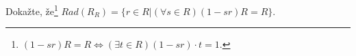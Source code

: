 \documentclass[12pt]{article}					%
\begin{document}

\begin{priklad}
	Dokažte, že\footnote{$(1 - sr) R = R \Leftrightarrow (\exists t \in R) (1 - sr)·t = 1$.} $Rad(R_R) = \{r \in R | (\forall s \in R) (1 - sr) R = R\}$.
\end{priklad}
\end{document}
